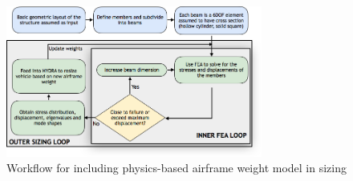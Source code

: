 \begin{figure}
\begin{center}
\includegraphics[width=0.75\textwidth]{images/fea_flowchart.png}
\vspace{-0.1cm}
\caption{Workflow for including physics-based airframe weight model in sizing}
\label{fig:fea_flowchart}
\end{center}
\end{figure}

